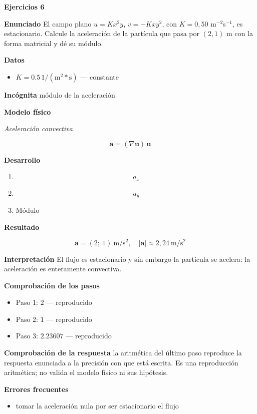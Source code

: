 \documentclass[10pt,openany]{book}
\begin{document}
\noindent\textbf{Ejercicios 6}

\noindent\textbf{Enunciado}
El campo plano \(u = K x^{2} y\), \(v = -K x y^{2}\), con \(K = 0{,}50\) m\(^{-2}\)s\(^{-1}\), es estacionario. Calcule la aceleración de la partícula que pasa por \((2, 1)\) m con la forma matricial y dé su módulo.

\noindent\textbf{Datos}
\begin{itemize}
\item $K = 0.5\,\mathrm{1/(m^2*s)}$ — constante
\end{itemize}

\noindent\textbf{Incógnita}
módulo de la aceleración

\noindent\textbf{Modelo físico}

\noindent\textit{Aceleración convectiva}

\[
\mathbf{a} = (\nabla\mathbf{u})\,\mathbf{u}
\]

\noindent\textbf{Desarrollo}
\begin{enumerate}
\item
\[
a_x
\]
\item
\[
a_y
\]
\item
Módulo
\end{enumerate}

\noindent\textbf{Resultado}

\[
\mathbf{a} = (2;\ 1)\ \mathrm{m/s^{2}},\quad |\mathbf{a}| \approx 2{,}24\ \mathrm{m/s^{2}}
\]

\noindent\textbf{Interpretación}
El flujo es estacionario y sin embargo la partícula se acelera: la aceleración es enteramente convectiva.

\noindent\textbf{Comprobación de los pasos}
\begin{itemize}
\item Paso 1: $2$ — reproducido
\item Paso 2: $1$ — reproducido
\item Paso 3: $2.23607$ — reproducido
\end{itemize}

\noindent\textbf{Comprobación de la respuesta} la aritmética del último paso reproduce la respuesta enunciada a la precisión con que está escrita. Es una reproducción aritmética; no valida el modelo físico ni sus hipótesis.

\noindent\textbf{Errores frecuentes}
\begin{itemize}
\item tomar la aceleración nula por ser estacionario el flujo
\end{itemize}
\end{document}
